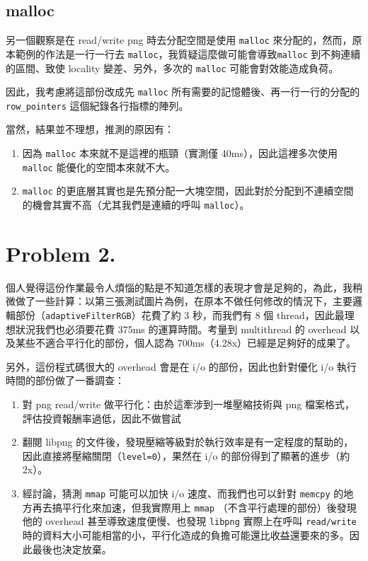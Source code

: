 \documentclass[12pt, a4paper]{article}
\begin{document}
\subsection*{malloc}
另一個觀察是在 read/write png 時去分配空間是使用 \lstinline{malloc} 來分配的，然而，原本範例的作法是一行一行去 \lstinline{malloc}，我質疑這麼做可能會導致\lstinline{malloc} 到不夠連續的區間、致使 locality 變差、另外，多次的 \lstinline{malloc} 可能會對效能造成負荷。

因此，我考慮將這部份改成先 \lstinline{malloc} 所有需要的記憶體後、再一行一行的分配的 \lstinline{row_pointers} 這個紀錄各行指標的陣列。

當然，結果並不理想，推測的原因有：
\begin{enumerate}
  \item 因為 \lstinline{malloc} 本來就不是這裡的瓶頸（實測僅 40ms），因此這裡多次使用 \lstinline{malloc} 能優化的空間本來就不大。
  \item \lstinline{malloc} 的更底層其實也是先預分配一大塊空間，因此對於分配到不連續空間的機會其實不高（尤其我們是連續的呼叫 \lstinline{malloc}）。
\end{enumerate}
\section*{Problem 2.}
個人覺得這份作業最令人煩惱的點是不知道怎樣的表現才會是足夠的，為此，我稍微做了一些計算：以第三張測試圖片為例，在原本不做任何修改的情況下，主要邏輯部份（\lstinline{adaptiveFilterRGB}）花費了約 3 秒，而我們有 8 個 thread，因此最理想狀況我們也必須要花費 375ms 的運算時間。考量到 multithread 的 overhead 以及某些不適合平行化的部份，個人認為 700ms（4.28x）已經是足夠好的成果了。

另外，這份程式碼很大的 overhead 會是在 i/o 的部份，因此也針對優化 i/o 執行時間的部份做了一番調查：
\begin{enumerate}
  \item 對 png read/write 做平行化：由於這牽涉到一堆壓縮技術與 png 檔案格式，評估投資報酬率過低，因此不做嘗試
  \item 翻閱 libpng 的文件後，發現壓縮等級對於執行效率是有一定程度的幫助的，因此直接將壓縮關閉（\lstinline{level=0}），果然在 i/o 的部份得到了顯著的進步（約 2x）。
  \item 經討論，猜測 \lstinline{mmap} 可能可以加快 i/o 速度、而我們也可以針對 \lstinline{memcpy} 的地方再去搞平行化來加速，但我實際用上 \lstinline{mmap} （不含平行處理的部份）後發現他的 overhead 甚至導致速度便慢、也發現 \lstinline{libpng} 實際上在呼叫 \lstinline{read/write} 時的資料大小可能相當的小，平行化造成的負擔可能還比收益還要來的多。因此最後也決定放棄。
\end{enumerate}
\end{document}

